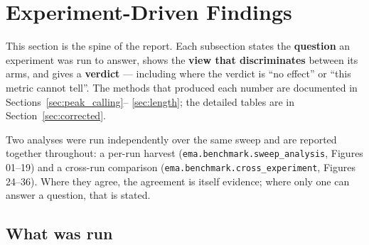\documentclass[11pt,a4paper]{article}
\begin{document}
\section{Experiment-Driven Findings}
\label{sec:experiments}

This section is the spine of the report. Each subsection states the
\textbf{question} an experiment was run to answer, shows the \textbf{view that
discriminates} between its arms, and gives a \textbf{verdict} --- including where
the verdict is ``no effect'' or ``this metric cannot tell''. The methods that
produced each number are documented in Sections~\ref{sec:peak_calling}--%
\ref{sec:length}; the detailed tables are in Section~\ref{sec:corrected}.

Two analyses were run independently over the same sweep and are reported
together throughout: a per-run harvest
(\texttt{ema.benchmark.sweep\_analysis}, Figures 01--19) and a cross-run
comparison (\texttt{ema.benchmark.cross\_experiment}, Figures 24--36). Where they
agree, the agreement is itself evidence; where only one can answer a question,
that is stated.

\subsection{What was run}
\end{document}
